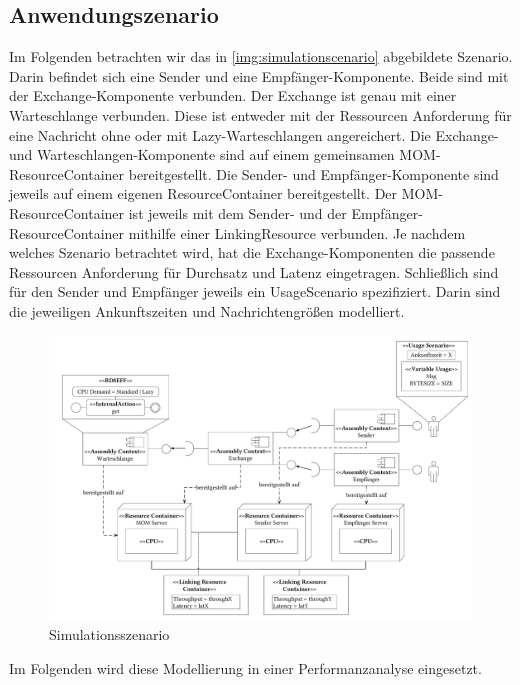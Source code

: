 \subsection{Anwendungszenario}
Im Folgenden betrachten wir das in \autoref{img:simulationscenario} abgebildete Szenario. Darin befindet sich eine Sender und eine Empfänger-Komponente. Beide sind mit der Exchange-Komponente verbunden. Der Exchange ist genau mit einer Warteschlange verbunden. Diese ist entweder mit der Ressourcen Anforderung für eine Nachricht ohne oder mit Lazy-Warteschlangen angereichert. Die Exchange- und Warteschlangen-Komponente sind auf einem gemeinsamen MOM-ResourceContainer bereitgestellt. Die Sender- und Empfänger-Komponente sind jeweils auf einem eigenen ResourceContainer bereitgestellt. Der MOM-ResourceContainer ist jeweils mit dem Sender- und der Empfänger-ResourceContainer mithilfe einer LinkingResource verbunden. Je nachdem welches Szenario betrachtet wird, hat die Exchange-Komponenten die passende Ressourcen Anforderung für Durchsatz und Latenz eingetragen. Schließlich sind für den Sender und Empfänger jeweils ein UsageScenario spezifiziert. Darin sind die jeweiligen Ankunftszeiten und Nachrichtengrößen modelliert.
\begin{figure}
\center
  \includegraphics[width=1.35\textwidth, angle=90]{images/modelling/modelingSimulationSzenario.pdf}
  \caption{Simulationsszenario }
  \label{img:simulationscenario}
\end{figure}
Im Folgenden wird diese Modellierung in einer Performanzanalyse eingesetzt.


